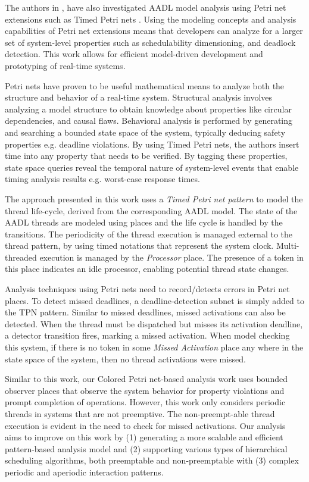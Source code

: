 The authors in \cite{kordon_sn}, have also investigated AADL model analysis using Petri net extensions such as Timed Petri nets \cite{kordon2009}. Using the modeling concepts and analysis capabilities of Petri net extensions means that developers can analyze for a larger set of system-level properties such as schedulability dimensioning, and deadlock detection. This work allows for efficient model-driven development and prototyping of real-time systems. 

Petri nets have proven to be useful mathematical means to analyze both the structure and behavior of a real-time system. Structural analysis involves analyzing a model structure to obtain knowledge about properties like circular dependencies, and causal flaws. Behavioral analysis is performed by generating and searching a bounded state space of the system, typically deducing safety properties e.g. deadline violations. By using Timed Petri nets, the authors insert time into any property that needs to be verified. By tagging these properties, state space queries reveal the temporal nature of system-level events that enable timing analysis results e.g. worst-case response times.

The approach presented in this work uses a \emph{Timed Petri net pattern} to model the thread life-cycle, derived from the corresponding AADL model. The state of the AADL threads are modeled using places and the life cycle is handled by the transitions. The periodicity of the thread execution is managed external to the thread pattern, by using timed notations that represent the system clock. Multi-threaded execution is managed by the \emph{Processor} place. The presence of a token in this place indicates an idle processor, enabling potential thread state changes. 

Analysis techniques using Petri nets need to record/detects errors in Petri net places. To detect missed deadlines, a deadline-detection subnet is simply added to the TPN pattern. Similar to missed deadlines, missed activations can also be detected. When the thread must be dispatched but misses its activation deadline, a detector transition fires, marking a missed activation. When model checking this system, if there is no token in some \emph{Missed Activation} place any where in the state space of the system, then no thread activations were missed. 

Similar to this work, our Colored Petri net-based analysis work uses bounded observer places \cite{Alpern1989} that observe the system behavior for property violations and prompt completion of operations. However, this work \cite{kordon2009} only considers periodic threads in systems that are not preemptive. The non-preempt-able thread execution is evident in the need to check for missed activations. Our analysis aims to improve on this work by (1) generating a more scalable and efficient pattern-based analysis model and (2) supporting various types of hierarchical scheduling algorithms, both preemptable and non-preemptable with (3) complex periodic and aperiodic interaction patterns.

